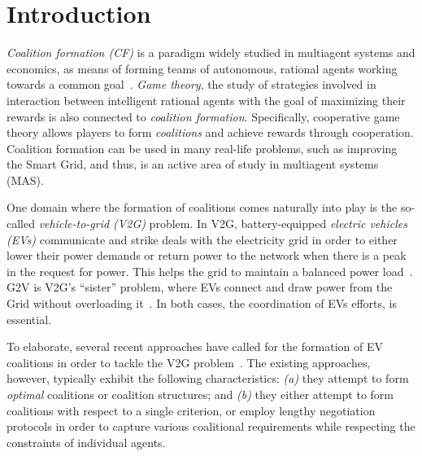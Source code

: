 
\chapter{Introduction} %

\label{Chapter1_intro} %

{\em Coalition formation (CF)} is a paradigm widely studied in multiagent systems and economics, as means of forming teams of autonomous, rational agents working towards a common goal~\cite{chalkiadakis2011computational}. {\em Game theory}, the study of strategies involved in interaction between intelligent rational agents with the goal of maximizing their rewards is also connected to {\em coalition formation}. Specifically, cooperative game theory allows players to form {\em coalitions} and achieve rewards through cooperation\cite{chalkiadakis2007abayesian}. Coalition formation can be used in many real-life problems, such as improving the Smart Grid, and thus, is an active area of study in multiagent systems (MAS).

One domain where the formation of coalitions comes naturally into play is the so-called {\em vehicle-to-grid (V2G)} problem. In V2G, battery-equipped {\em electric vehicles (EVs)} communicate and strike deals with the electricity grid in order to either lower their power demands or return power to the network when there is a peak in the request for power. This helps the grid to maintain 
a balanced power load~\cite{ramchurn2012putting}. 
G2V is V2G's ``sister'' problem, where EVs connect and draw power from the Grid without overloading it~\cite{valogianni2014effective}. 
In both cases, the coordination of EVs efforts, is essential.

To elaborate, several recent approaches have called for the formation of EV coalitions in order to tackle the V2G problem~\cite{deORamos2014,kamboj2010exploring,kamboj2011deploying}.
The existing approaches, however, typically exhibit the following characteristics: {\em (a)} they attempt to form {\em optimal} coalitions or coalition structures; and {\em (b)} they either attempt to form coalitions with respect to a single criterion, or employ lengthy negotiation protocols in order to capture various coalitional requirements while respecting the constraints of individual agents. 

